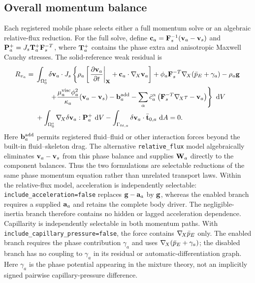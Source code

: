 \subsection{Overall momentum balance}
\label{sec:momentum_weak_form}

Each registered mobile phase selects either a full momentum solve or an
algebraic relative-flux reduction.  For the full solve, define
\(\mathbf{c}_a=\mathbf{F}_s^{-1}(\mathbf{v}_a-\mathbf{v}_s)\) and
\(\mathbf{P}_a^+=J_s\mathbf{T}_a^+\mathbf{F}_s^{-T}\), where \(\mathbf{T}_a^+\) contains
the phase extra and anisotropic Maxwell Cauchy stresses.  The solid-reference
weak residual is
\begin{align}
 R_{v_a}={}&\int_{\Omega_0^s}\delta \mathbf{v}_a\cdot J_s\left\{
 \rho_a\left[\left.\frac{\partial\mathbf{v}_a}{\partial t}\right|_{\mathbf{X}}
 +\mathbf{c}_a\cdot\nabla_{\!X}\mathbf{v}_a\right]
 +\phi_a\mathbf{F}_s^{-T}\nabla_{\!X}(\bar p_E+\gamma_a)-\rho_a\mathbf{g}\right.\notag\\
 &\left.\qquad
 +\frac{\mu_a^{\rm visc}\phi_a^2}{\kappa_a}(\mathbf{v}_a-\mathbf{v}_s)
 -\mathbf{b}_a^{\rm add}
 -\sum_\alpha\dot c_a^\alpha
 \left(\mathbf{F}_s^{-T}\nabla_{\!X}\tau-\mathbf{v}_a\right)
 \right\}\,\,\mathrm{d} V\notag\\
 &+\int_{\Omega_0^s}\nabla_{\!X}\delta \mathbf{v}_a:\mathbf{P}_a^+\,\,\mathrm{d} V
 -\int_{\Gamma_{0t,a}}\delta \mathbf{v}_a\cdot\bar{\mathbf{t}}_{0,a}\,\,\mathrm{d} A=0.
 \label{eq:implementation_full_phase_momentum_residual}
\end{align}
Here \(\mathbf{b}_a^{\rm add}\) permits registered fluid--fluid or other
interaction forces beyond the built-in fluid--skeleton drag.  The alternative
\texttt{relative\_flux} model algebraically eliminates \(\mathbf{v}_a-\mathbf{v}_s\)
from this phase balance and supplies \(\mathbf{W}_a\) directly to the component
balances.  Thus the two formulations are selectable reductions of the same
phase momentum equation rather than unrelated transport laws.  Within the
relative-flux model, acceleration is independently selectable:
\texttt{include\_acceleration=false} replaces
\(\mathbf{g}-\mathbf{a}_a\) by \(\mathbf{g}\), whereas the enabled branch requires a
supplied \(\mathbf{a}_a\) and retains the complete body driver.  The negligible-
inertia branch therefore contains no hidden or lagged acceleration dependence.
Capillarity is independently selectable in both momentum paths.  With
\texttt{include\_capillary\_pressure=false}, the force contains
\(\nabla_{\!X}\bar p_E\) only.  The enabled branch requires the phase contribution
\(\gamma_a\) and uses \(\nabla_{\!X}(\bar p_E+\gamma_a)\); the disabled branch has no
coupling to \(\gamma_a\) in its residual or automatic-differentiation graph.
Here \(\gamma_a\) is the phase potential appearing in the mixture theory, not
an implicitly signed pairwise capillary-pressure difference.

